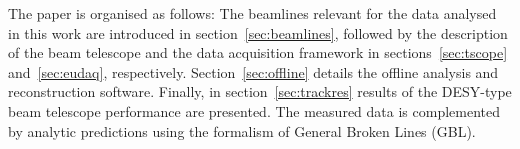 The paper is organised as follows: 
The beamlines relevant for the data analysed in this work are introduced in section~\ref{sec:beamlines}, followed by the description of the beam telescope
 and the data acquisition framework in sections~\ref{sec:tscope} and~\ref{sec:eudaq}, respectively.
Section~\ref{sec:offline} details the offline analysis and reconstruction software. 
Finally, in section~\ref{sec:trackres} results of the DESY-type beam telescope performance are presented. %
The measured data is complemented by analytic predictions using the formalism of General Broken Lines (GBL).\,\cite{Blobel-2006,Kleinwort-2012}
